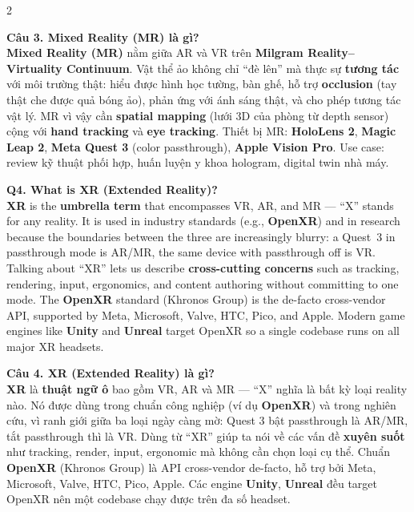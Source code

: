 \begin{paracol}{2}
\switchcolumn

\textbf{Câu 3. Mixed Reality (MR) là gì?}\\
\textbf{Mixed Reality (MR)} nằm giữa AR và VR trên \textbf{Milgram Reality--Virtuality Continuum}. Vật thể ảo không chỉ ``đè lên'' mà thực sự \textbf{tương tác} với môi trường thật: hiểu được hình học tường, bàn ghế, hỗ trợ \textbf{occlusion} (tay thật che được quả bóng ảo), phản ứng với ánh sáng thật, và cho phép tương tác vật lý. MR vì vậy cần \textbf{spatial mapping} (lưới 3D của phòng từ depth sensor) cộng với \textbf{hand tracking} và \textbf{eye tracking}. Thiết bị MR: \textbf{HoloLens 2}, \textbf{Magic Leap 2}, \textbf{Meta Quest 3} (color passthrough), \textbf{Apple Vision Pro}. Use case: review kỹ thuật phối hợp, huấn luyện y khoa hologram, digital twin nhà máy.

\switchcolumn*

\textbf{Q4. What is XR (Extended Reality)?}\\
\textbf{XR} is the \textbf{umbrella term} that encompasses VR, AR, and MR --- ``X'' stands for any reality. It is used in industry standards (e.g., \textbf{OpenXR}) and in research because the boundaries between the three are increasingly blurry: a Quest~3 in passthrough mode is AR/MR, the same device with passthrough off is VR. Talking about ``XR'' lets us describe \textbf{cross-cutting concerns} such as tracking, rendering, input, ergonomics, and content authoring without committing to one mode. The \textbf{OpenXR} standard (Khronos Group) is the de-facto cross-vendor API, supported by Meta, Microsoft, Valve, HTC, Pico, and Apple. Modern game engines like \textbf{Unity} and \textbf{Unreal} target OpenXR so a single codebase runs on all major XR headsets.

\switchcolumn

\textbf{Câu 4. XR (Extended Reality) là gì?}\\
\textbf{XR} là \textbf{thuật ngữ ô} bao gồm VR, AR và MR --- ``X'' nghĩa là bất kỳ loại reality nào. Nó được dùng trong chuẩn công nghiệp (ví dụ \textbf{OpenXR}) và trong nghiên cứu, vì ranh giới giữa ba loại ngày càng mờ: Quest 3 bật passthrough là AR/MR, tắt passthrough thì là VR. Dùng từ ``XR'' giúp ta nói về các vấn đề \textbf{xuyên suốt} như tracking, render, input, ergonomic mà không cần chọn loại cụ thể. Chuẩn \textbf{OpenXR} (Khronos Group) là API cross-vendor de-facto, hỗ trợ bởi Meta, Microsoft, Valve, HTC, Pico, Apple. Các engine \textbf{Unity}, \textbf{Unreal} đều target OpenXR nên một codebase chạy được trên đa số headset.


\end{paracol}
